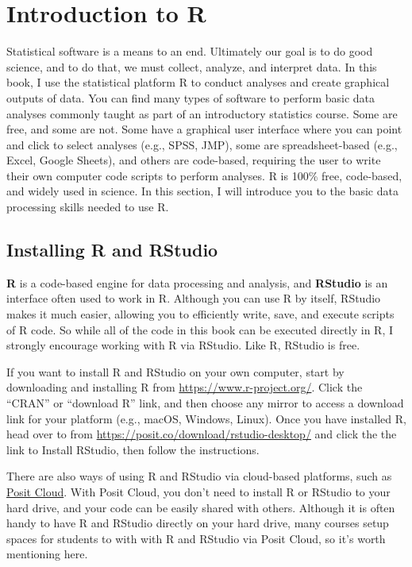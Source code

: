 \documentclass[
]{book}
\begin{document}
\section{Introduction to R}\label{introduction-to-r}

Statistical software is a means to an end. Ultimately our goal is to do good science, and to do that, we must collect, analyze, and interpret data. In this book, I use the statistical platform R to conduct analyses and create graphical outputs of data. You can find many types of software to perform basic data analyses commonly taught as part of an introductory statistics course. Some are free, and some are not. Some have a graphical user interface where you can point and click to select analyses (e.g., SPSS, JMP), some are spreadsheet-based (e.g., Excel, Google Sheets), and others are code-based, requiring the user to write their own computer code scripts to perform analyses. R is 100\% free, code-based, and widely used in science. In this section, I will introduce you to the basic data processing skills needed to use R.

\subsection{Installing R and RStudio}\label{installing-r-and-rstudio}

\textbf{R} is a code-based engine for data processing and analysis, and \textbf{RStudio} is an interface often used to work in R. Although you can use R by itself, RStudio makes it much easier, allowing you to efficiently write, save, and execute scripts of R code. So while all of the code in this book can be executed directly in R, I strongly encourage working with R via RStudio. Like R, RStudio is free.

If you want to install R and RStudio on your own computer, start by downloading and installing R from \url{https://www.r-project.org/}. Click the ``CRAN'' or ``download R'' link, and then choose any mirror to access a download link for your platform (e.g., macOS, Windows, Linux). Once you have installed R, head over to from \url{https://posit.co/download/rstudio-desktop/} and click the the link to Install RStudio, then follow the instructions.

There are also ways of using R and RStudio via cloud-based platforms, such as \href{https://posit.cloud}{Posit Cloud}. With Posit Cloud, you don't need to install R or RStudio to your hard drive, and your code can be easily shared with others. Although it is often handy to have R and RStudio directly on your hard drive, many courses setup spaces for students to with with R and RStudio via Posit Cloud, so it's worth mentioning here.
\end{document}
